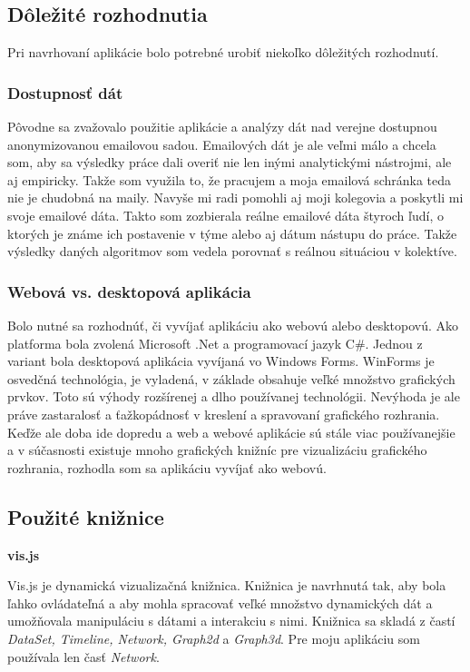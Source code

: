 \documentclass[slovak,master,public,dept460,male,cpdeclaration,oneside]{diploma}
\begin{document}
\subsection{Dôležité rozhodnutia}
Pri navrhovaní aplikácie bolo potrebné urobiť niekoľko dôležitých rozhodnutí.

\subsubsection{Dostupnosť dát}
Pôvodne sa zvažovalo použitie aplikácie a analýzy dát nad verejne dostupnou anonymizovanou emailovou sadou. Emailových dát je ale veľmi málo a chcela som, aby sa výsledky práce dali overiť nie len inými analytickými nástrojmi, ale aj empiricky. Takže som využila to, že pracujem a moja emailová schránka teda nie je chudobná na maily. Navyše mi radi pomohli aj moji kolegovia a poskytli mi svoje emailové dáta. Takto som zozbierala reálne emailové dáta štyroch ľudí, o ktorých je známe ich postavenie v týme alebo aj dátum nástupu do práce. Takže výsledky daných algoritmov som vedela porovnať s reálnou situáciou v kolektíve.

\subsubsection{Webová vs. desktopová aplikácia}
Bolo nutné sa rozhodnúť, či vyvíjať aplikáciu ako webovú alebo desktopovú. Ako platforma bola zvolená Microsoft .Net a programovací jazyk C\#. Jednou z variant bola desktopová aplikácia vyvíjaná vo Windows Forms. WinForms je osvedčná technológia, je vyladená, v základe obsahuje veľké množstvo grafických prvkov. Toto sú výhody rozšírenej a dlho používanej technológii. Nevýhoda je ale práve zastaralosť a ťažkopádnosť v kreslení a spravovaní grafického rozhrania. Keďže ale doba ide dopredu a web a webové aplikácie sú stále viac používanejšie a v súčasnosti existuje mnoho grafických knižníc pre vizualizáciu grafického rozhrania, rozhodla som sa aplikáciu vyvíjať ako webovú.


\subsection{Použité knižnice}


\textbf{vis.js}


\noindent Vis.js je dynamická vizualizačná knižnica. Knižnica je navrhnutá tak, aby bola ľahko ovládateľná a aby mohla spracovať veľké množstvo dynamických dát a umožňovala manipuláciu s dátami a interakciu s nimi. Knižnica sa skladá z častí \textit{DataSet, Timeline, Network, Graph2d} a \textit{Graph3d}.
Pre moju aplikáciu som používala len časť \textit{Network}.
\end{document}

